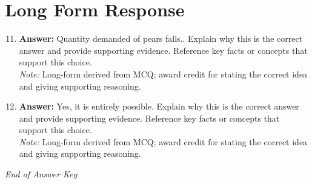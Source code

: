 \documentclass[12pt]{article}
\begin{document}
\section*{Long Form Response}
\begin{enumerate}[label=\arabic*.]
\setcounter{enumi}{10}
\item \textbf{Answer:} Quantity demanded of pears falls.. Explain why this is the correct answer and provide supporting evidence. Reference key facts or concepts that support this choice.
\\ \textit{Note:} Long-form derived from MCQ; award credit for stating the correct idea and giving supporting reasoning.
\item \textbf{Answer:} Yes, it is entirely possible. Explain why this is the correct answer and provide supporting evidence. Reference key facts or concepts that support this choice.
\\ \textit{Note:} Long-form derived from MCQ; award credit for stating the correct idea and giving supporting reasoning.
\end{enumerate}

\vfill
\noindent\textit{End of Answer Key}
\end{document}
